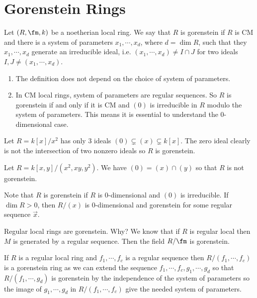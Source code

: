
\newpage
\section{Gorenstein Rings}

\begin{dfn}
Let $(R,\fm,k)$ be a noetherian local ring. We say that $R$ is gorenstein if $R$ is CM and there is a system of parameters $x_1,\cdots,x_d$, where $d=\dim R$, such that they $x_1,\cdots,x_d$ generate an irreducible ideal, i.e. $(x_1,\cdots,x_d) \neq I \cap J$ for two ideals $I,J \neq (x_1,\cdots,x_d)$. 
\end{dfn}

\begin{enumerate}[1.]
\item The definition does not depend on the choice of system of parameters. 
\item In CM local rings, system of parameters are regular sequences. So $R$ is gorenstein if and only if it is CM and $(0)$ is irreducible in $R$ modulo the system of parameters. This means it is essential to understand the 0-dimensional case. 
\end{enumerate}

\begin{ex}
Let $R=k[x]/x^2$ has only 3 ideals $(0) \subsetneq (x) \subsetneq k[x]$. The zero ideal clearly is not the intersection of two nonzero ideals so $R$ is gorenstein. 
\end{ex}

\begin{ex}
Let $R=k[x,y]/(x^2,xy,y^2)$. We have $(0)=(x) \cap (y)$ so that $R$ is not gorenstein. 
\end{ex}

Note that $R$ is gorenstein if $R$ is 0-dimensional and $(0)$ is irreducible. If $\dim R>0$, then $R/(x)$ is 0-dimensional and gorenstein for some regular sequence $\vec{x}$.

\begin{ex}
Regular local rings are gorenstein. Why? We know that if $R$ is regular local then $M$ is generated by a regular sequence. Then the field $R/\fm$ is gorenstein. 
\end{ex}

\begin{ex}
If $R$ is a regular local ring and $f_1,\cdots,f_c$ is a regular sequence then $R/(f_1,\cdots,f_c)$ is a gorenstein ring as we can extend the sequence $f_1,\cdots,f_c,g_1,\cdots,g_d$ so that $R/(f_1,\cdots,g_d)$ is gorenstein by the independence of the system of parameters so the image of $g_1,\cdots,g_d$ in $R/(f_1,\cdots,f_c)$ give the needed system of parameters. 
\end{ex}

